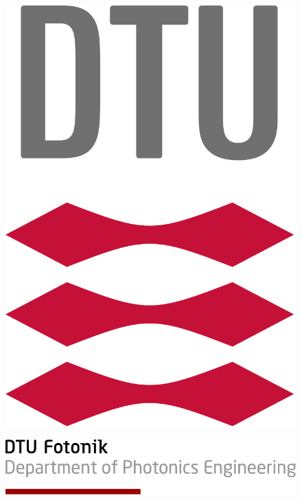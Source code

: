 \documentclass{report}
\title{
\vspace{-0.5in}
\noindent\makebox[\linewidth]{\rule{\textwidth}{1pt}} 
\textmd{\textbf{\hmwkClass \hmwkTitle}}\\
\normalsize\vspace{0.1in}\small{\hmwkDueDate}\\
\vspace{0.1in}\large{\textit{\hmwkClassInstructor\ \hmwkClassTime}}
\noindent\makebox[\linewidth]{\rule{\textwidth}{1pt}} 
\vspace{1in}
}
\author{\textbf{\hmwkAuthorName}}
\date{} %
\begin{document}
\begin{figure}
	\centering
	\includegraphics[scale=0.15]{dtulogo.png}
\end{figure}

\begin{figure}[!b]
	\includegraphics[scale=0.25]{dtufooter.png}
\end{figure}
\maketitle

\end{document}

